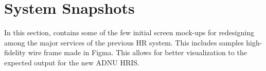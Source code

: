 
 
    
        
        
        
        
    
\section{System Snapshots}

In this section, contains some of the few initial screen mock-ups for redesigning among the major services of the previous HR system. This includes samples high-fidelity wire frame made in Figma. This allows for better visualization to the expected output for the new ADNU HRIS.

